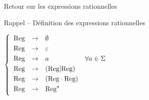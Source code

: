 \begin{frame}{Retour sur les expressions rationnelles}
\begin{block}{Rappel -- Définition des expressions rationnelles}
\begin{minipage}{.5\textwidth}
      \vspace{2mm}
      $\left\{\begin{array}{llll}
      \vspace{1mm}\text{Reg} &\rightarrow& \emptyset \\
      \vspace{1mm}\text{Reg} &\rightarrow& \varepsilon \\
      \vspace{1mm}\text{Reg} &\rightarrow& a & \forall a\in \Sigma \\
      \vspace{1mm}\text{Reg} &\rightarrow& (\text{Reg} | \text{Reg}) \\
      \vspace{1mm}\text{Reg} &\rightarrow& (\text{Reg} \cdot \text{Reg}) \\
      \vspace{1mm}\text{Reg} &\rightarrow& \text{Reg}^\star \\
      \end{array}\right.$
    \end{minipage}%
  \end{block}
\end{frame}

\endgroup

